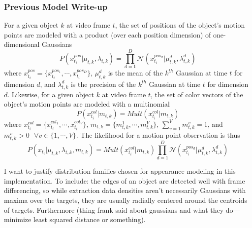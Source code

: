\documentclass{article}
\begin{document}
\subsubsection{Previous Model Write-up}


For a given object $k$ at video frame $t$, the set of positions of the object's motion points are modeled with a product (over each position dimension) of one-dimensional Gaussians
\begin{equation}
P(x_{t_{i}}^{pos} | \mu_{t, k}, \lambda_{t, k}) = \prod_{d=1}^{D} \mathcal{N}(x_{t_{i}}^{pos_{d}} | \mu_{t, k}^{d}, \lambda_{t, k}^{d})
\end{equation}
where $x_{t_{i}}^{pos} = \{ x_{t_{i}}^{pos_{1}}, \cdots, x_{t_{i}}^{pos_{D}} \}$,  $\mu_{t, k}^{d}$ is the mean of the $k^{th}$ Gaussian at time $t$ for dimension $d$, and $\lambda_{t, k}^{d}$ is the precision of the $k^{th}$ Gaussian at time $t$ for dimension $d$.  Likewise, for a given object $k$ at video frame $t$, the set of color vectors of the object's motion points are modeled with a multinomial
\begin{equation}
P(x_{t_{i}}^{col} | m_{t, k}) = Mult(x_{t_{i}}^{col} | m_{t, k})
\end{equation}
where $x_{t_{i}}^{col} = \{ x_{t_{i}}^{col_{1}}, \cdots, x_{t_{i}}^{col_{V}} \}$, $m_{t,k} = \{ m_{t,k}^{1}, \cdots, m_{t,k}^{V} \}$, $\sum_{v=1}^{V} m_{t, k}^{v} = 1$, and $m_{t,k}^{v}>0 \hspace{8pt} \forall v \in \{ 1, \cdots, V \}$. The likelihood for a motion point observation is thus
\begin{equation}
P(x_{t_{i}} | \mu_{t, k}, \lambda_{t, k}, m_{t, k}) =  Mult(x_{t_{i}}^{col} | m_{t, k})   \prod_{d=1}^{D}  \mathcal{N}(x_{t_{i}}^{pos_{d}} | \mu_{t, k}^{d}, \lambda_{t, k}^{d}) 
\end{equation}

I want to justify distribution families chosen for appearance modeling in this implementation. To include: the edges of an object are detected well with frame differencing, so while extraction data densities aren't necessarily Gaussians with maxima over the targets, they are usually radially centered around the centroids of targets. Furthermore (thing frank said about gaussians and what they do---minimize least squared distance or something).
\end{document}
